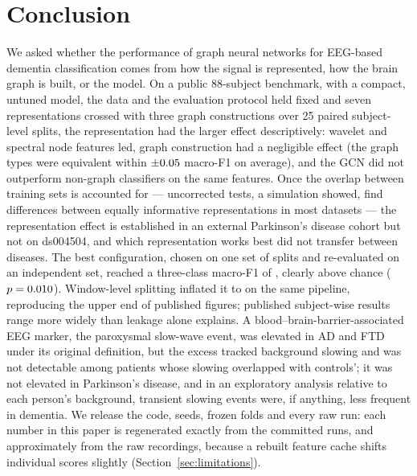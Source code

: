\section{Conclusion}\label{sec:conclusion}
We asked whether the performance of graph neural networks for EEG-based dementia classification comes
from how the signal is represented, how the brain graph is built, or the model. On a public
88-subject benchmark, with a compact, untuned model, the data and the evaluation protocol held fixed and seven
representations crossed with three graph constructions over 25 paired subject-level splits, the
representation had the larger effect descriptively: wavelet and spectral node features led, graph construction had a negligible effect (the graph types were equivalent within $\pm0.05$ macro-F1 on average), and the GCN did not outperform non-graph classifiers on the same features. Once the
overlap between training sets is accounted for --- uncorrected tests, a simulation showed, find
differences between equally informative representations in most datasets --- the representation effect
is established in an external Parkinson's disease cohort but not on ds004504, and which representation
works best did not transfer between diseases.
The best configuration, chosen on one set of splits and re-evaluated on an independent set, reached a
three-class macro-F1 of \confFOne{}, clearly above chance ($p=0.010$). Window-level splitting
inflated it to \cleakPThreespatialLeakySubj{} on the same pipeline, reproducing the upper end of published
figures; published subject-wise results range more widely than leakage alone explains. A
blood--brain-barrier-associated EEG marker, the paroxysmal slow-wave event, was elevated in AD and FTD under
its original definition, but the excess tracked background slowing and was not detectable among patients
whose slowing overlapped with controls'; it was not elevated in Parkinson's disease, and in an exploratory analysis relative to each person's background, transient slowing events were, if anything, less frequent in dementia. We release the code, seeds, frozen folds and every raw run: each number in this paper is regenerated exactly from the committed runs, and approximately from the raw recordings, because a rebuilt feature cache shifts individual scores slightly (Section~\ref{sec:limitations}).
